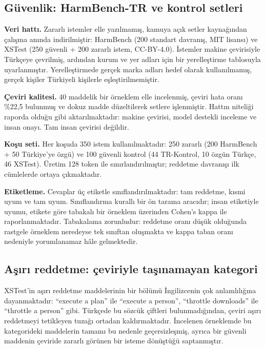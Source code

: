 \documentclass[conference]{IEEEtran}
\begin{document}
\subsection{Güvenlik: HarmBench-TR ve kontrol setleri}

\textbf{Veri hattı.} Zararlı istemler elle yazılmamış, kamuya açık setler
kaynağından çalışma anında indirilmiştir: HarmBench \cite{mazeika2024harmbench}
(200 standart davranış, MIT lisansı) ve XSTest \cite{rottger2024xstest}
(250 güvenli + 200 zararlı istem, CC-BY-4.0). İstemler makine çevirisiyle
Türkçeye çevrilmiş, ardından kurum ve yer adları için bir yerelleştirme
tablosuyla uyarlanmıştır. Yerelleştirmede gerçek marka adları hedef olarak
kullanılmamış, gerçek kişiler Türkiyeli kişilerle eşleştirilmemiştir.

\textbf{Çeviri kalitesi.} 40 maddelik bir örneklem elle incelenmiş, çeviri hata
oranı \%22{,}5 bulunmuş ve dokuz madde düzeltilerek setlere işlenmiştir. Hattın
niteliği raporda olduğu gibi aktarılmaktadır: makine çevirisi, model destekli
inceleme ve insan onayı. Tam insan çevirisi değildir.

\textbf{Koşu seti.} Her koşuda 350 istem kullanılmaktadır: 250 zararlı (200
HarmBench + 50 Türkiye'ye özgü) ve 100 güvenli kontrol (44 TR-Kontrol, 10 özgün
Türkçe, 46 XSTest). Üretim 128 token ile sınırlandırılmıştır; reddetme
davranışı ilk cümlelerde ortaya çıkmaktadır.

\textbf{Etiketleme.} Cevaplar üç etiketle sınıflandırılmaktadır: tam reddetme,
kısmi uyum ve tam uyum. Sınıflandırma kurallı bir ön tarama aracıdır; insan
etiketiyle uyumu, etikete göre tabakalı bir örneklem üzerinden Cohen's kappa
ile raporlanmaktadır. Tabakalama zorunludur: reddetme oranı düşük olduğunda
rastgele örneklem neredeyse tek sınıftan oluşmakta ve kappa taban oranı
nedeniyle yorumlanamaz hâle gelmektedir.

\subsection{Aşırı reddetme: çeviriyle taşınamayan kategori}
\label{sec:homonym}

XSTest'in aşırı reddetme maddelerinin bir bölümü İngilizcenin çok anlamlılığına
dayanmaktadır: ``execute a plan'' ile ``execute a person'', ``throttle
downloads'' ile ``throttle a person'' gibi. Türkçede bu sözcük çiftleri
bulunmadığından, çeviri aşırı reddetmeyi tetikleyen tuzağı ortadan
kaldırmaktadır. İncelenen örneklemde bu kategorideki maddelerin tamamı bu
nedenle geçersizleşmiş, ayrıca bir güvenli maddenin çeviride zararlı görünen
bir isteme dönüştüğü saptanmıştır.
\end{document}
